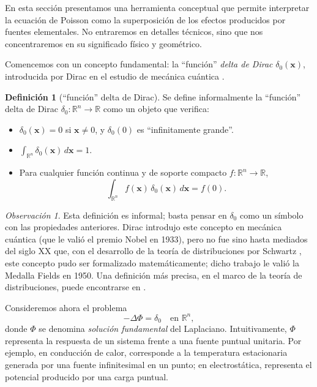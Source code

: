 \documentclass[12pt, a4paper]{amsbook}
\newcommand{\R}{{\mathbb R}}
\newcommand{\xx}{{\mathbf x}}
\theoremstyle{remark}
\newtheorem{obs}[teo]{Observación}
\theoremstyle{definition}
\newtheorem{defi}[teo]{Definición}
\numberwithin{section}{chapter}
\numberwithin{subsection}{section}
\numberwithin{equation}{section}
\numberwithin{figure}{chapter}
\begin{document}
En esta sección presentamos una herramienta conceptual que permite interpretar la ecuación de Poisson como la superposición de los efectos producidos por fuentes elementales. No entraremos en detalles técnicos, sino que nos concentraremos en su significado físico y geométrico.

Comencemos con un concepto fundamental: la ``función'' \emph{delta de Dirac} $\delta_0(\xx)$, introducida por Dirac en el estudio de mecánica cuántica \cite{Dirac}.

\begin{defi}[``función'' delta de Dirac]\label{def:dirac}
Se define informalmente la ``función'' delta de Dirac $\delta_0\colon \R^n\to\R$ como un objeto que verifica:
\begin{itemize}
\item $\delta_0(\xx) = 0$ si $\xx\neq 0$, y $\delta_0(0)$ es ``infinitamente grande''.
\item $\int_{\R^n} \delta_0(\xx)\, d\xx = 1$.
\item Para cualquier función continua y de soporte compacto $f\colon \R^n\to\R$, 
$$
\int_{\R^n} f(\xx)\,\delta_0(\xx)\, d\xx = f(0).
$$
\end{itemize}
\end{defi}

\begin{obs}
Esta definición es informal; basta pensar en $\delta_0$ como un símbolo con las propiedades anteriores. Dirac introdujo este concepto en mecánica cuántica (que le valió el premio Nobel en 1933), pero no fue sino hasta mediados del siglo XX que, con el desarrollo de la teoría de distribuciones por Schwartz \cite{Schwartz}, este concepto pudo ser formalizado matemáticamente; dicho trabajo le valió la Medalla Fields en 1950. Una definición más precisa, en el marco de la teoría de distribuciones, puede encontrarse en \cite{Bonder}.
\end{obs}

\medskip

Consideremos ahora el problema
\[
-\Delta \Phi = \delta_0 \quad \text{en } \R^n,
\]
donde \(\Phi\) se denomina \emph{solución fundamental} del Laplaciano. Intuitivamente, \(\Phi\) representa la respuesta de un sistema frente a una fuente puntual unitaria. Por ejemplo, en conducción de calor, corresponde a la temperatura estacionaria generada por una fuente infinitesimal en un punto; en electrostática, representa el potencial producido por una carga puntual. 
\end{document}
